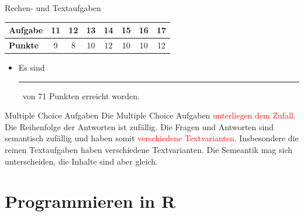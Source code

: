 \documentclass[a4paper, 9pt]{scrartcl}\usepackage[]{graphicx}\usepackage[]{xcolor}
\begin{document}
\begin{graybox}{Rechen- und Textaufgaben}
  \begin{center}
    \large
    \begin{tabular}{|l|c|c|c|c|c|c|c|}
      \hline
      \textbf{Aufgabe} & \textbf{11} & \textbf{12} & \textbf{13} & \textbf{14} & \textbf{15} & \textbf{16} & \textbf{17} \strut\\
      \hline
      \textbf{Punkte} & 
      \hspace{1Ex}\Large\textcolor{gray!70}{9}\hspace{1Ex}  & 
      \hspace{1Ex}\Large\textcolor{gray!70}{8}\hspace{1Ex}  & 
      \hspace{1Ex}\Large\textcolor{gray!70}{10}\hspace{1Ex}  & 
      \hspace{1Ex}\Large\textcolor{gray!70}{12}\hspace{1Ex}  & 
      \hspace{1Ex}\Large\textcolor{gray!70}{10}\hspace{1Ex}  & 
      \hspace{1Ex}\Large\textcolor{gray!70}{10}\hspace{1Ex}  & 
      \hspace{1Ex}\Large\textcolor{gray!70}{12}\hspace{1Ex} \strut\\
      \hline
  \end{tabular}
\end{center}
\begin{itemize}
\item Es sind \rule[0ex]{2em}{.4pt}\, von 71 Punkten erreicht worden.
\end{itemize}
\end{graybox}

\clearpage
\begin{graybox}{Multiple Choice Aufgaben}
Die Multiple Choice Aufgaben \textcolor{red}{unterliegen dem Zufall}. Die Reihenfolge der Antworten ist zufällig. Die Fragen und Antworten sind semantisch zufällig und haben somit \textcolor{red}{verschiedene Textvarianten}. Insbesondere die reinen Textaufgaben haben verschiedene Textvarianten. Die Semeantik mag sich unterscheiden, die Inhalte sind aber gleich.
\end{graybox}
\section*{Programmieren in R} 
\end{document}

